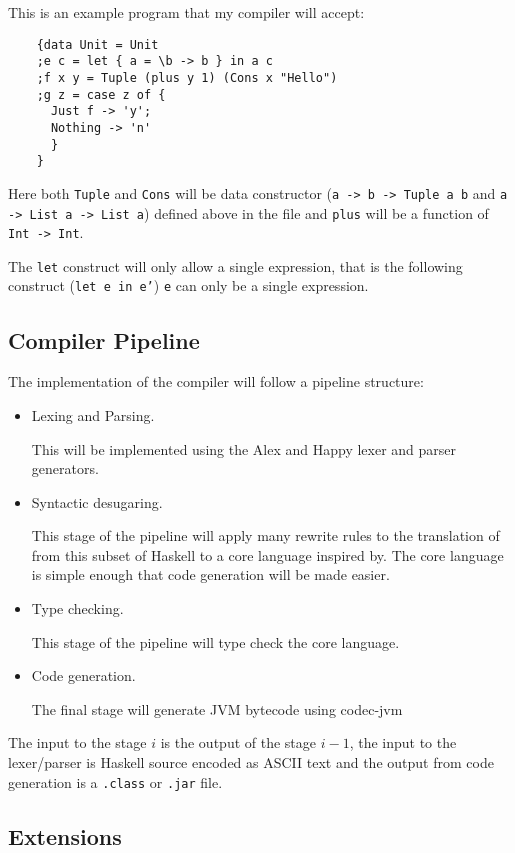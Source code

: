 \documentclass[a4paper]{article}
\begin{document}
  This is an example program that my compiler will accept:

  \begin{verbatim}
    {data Unit = Unit
    ;e c = let { a = \b -> b } in a c
    ;f x y = Tuple (plus y 1) (Cons x "Hello")
    ;g z = case z of {
      Just f -> 'y';
      Nothing -> 'n'
      }
    }
  \end{verbatim}

  Here both \texttt{Tuple} and \texttt{Cons} will be data constructor (\texttt{a -> b -> Tuple a b} and \texttt{a -> List a -> List a}) 
  defined above in the file and \texttt{plus} will be a function of \texttt{Int -> Int}.

  The \texttt{let} construct will only allow a single expression, that is the following construct (\texttt{let e in e'})
  \texttt{e} can only be a single expression.

  \subsection*{Compiler Pipeline}
  The implementation of the compiler will follow a pipeline structure:

  \begin{itemize}
    \item Lexing and Parsing.

      This will be implemented using the Alex and Happy lexer and parser generators.
    \item Syntactic desugaring.

      This stage of the pipeline will apply many rewrite rules to the translation of from this subset of Haskell to a core language inspired by\cite{typedcorelink}.
      The core language is simple enough that code generation will be made easier.
    \item Type checking.

     This stage of the pipeline will type check the core language.
    \item Code generation.

     The final stage will generate JVM bytecode using codec-jvm \cite{codec-jvm-link}
  \end{itemize}

  The input to the stage $i$ is the output of the stage $i-1$, the input to the lexer/parser is Haskell source encoded as ASCII text and the
  output from code generation is a \texttt{.class} or \texttt{.jar} file. 

  \subsection*{Extensions}
\end{document}
